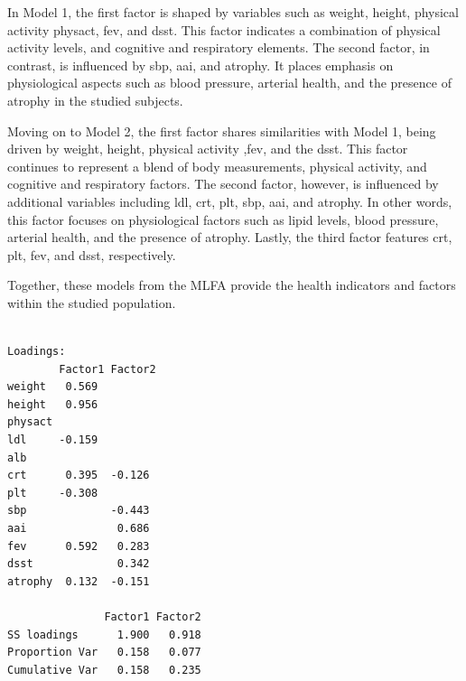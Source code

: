 \documentclass[
  letterpaper,
  DIV=11,
  numbers=noendperiod]{scrartcl}
\newenvironment{Shaded}{}{}
\newcommand{\AttributeTok}[1]{\textcolor[rgb]{0.84,0.60,0.13}{#1}}
\newcommand{\CommentTok}[1]{\textcolor[rgb]{0.57,0.51,0.45}{#1}}
\newcommand{\DecValTok}[1]{\textcolor[rgb]{0.96,0.45,0.00}{#1}}
\newcommand{\FunctionTok}[1]{\textcolor[rgb]{0.41,0.62,0.42}{#1}}
\newcommand{\NormalTok}[1]{\textcolor[rgb]{0.24,0.22,0.21}{#1}}
\newcommand{\OtherTok}[1]{\textcolor[rgb]{0.41,0.62,0.42}{#1}}
\newcommand{\SpecialCharTok}[1]{\textcolor[rgb]{0.69,0.38,0.53}{#1}}
\newcommand{\StringTok}[1]{\textcolor[rgb]{0.60,0.59,0.10}{#1}}
\begin{document}
In Model 1, the first factor is shaped by variables such as weight,
height, physical activity physact, fev, and dsst. This factor indicates
a combination of physical activity levels, and cognitive and respiratory
elements. The second factor, in contrast, is influenced by sbp, aai, and
atrophy. It places emphasis on physiological aspects such as blood
pressure, arterial health, and the presence of atrophy in the studied
subjects.

Moving on to Model 2, the first factor shares similarities with Model 1,
being driven by weight, height, physical activity ,fev, and the dsst.
This factor continues to represent a blend of body measurements,
physical activity, and cognitive and respiratory factors. The second
factor, however, is influenced by additional variables including ldl,
crt, plt, sbp, aai, and atrophy. In other words, this factor focuses on
physiological factors such as lipid levels, blood pressure, arterial
health, and the presence of atrophy. Lastly, the third factor features
crt, plt, fev, and dsst, respectively.

Together, these models from the MLFA provide the health indicators and
factors within the studied population.

\begin{Shaded}
\end{Shaded}

\begin{verbatim}

Loadings:
        Factor1 Factor2
weight   0.569         
height   0.956         
physact                
ldl     -0.159         
alb                    
crt      0.395  -0.126 
plt     -0.308         
sbp             -0.443 
aai              0.686 
fev      0.592   0.283 
dsst             0.342 
atrophy  0.132  -0.151 

               Factor1 Factor2
SS loadings      1.900   0.918
Proportion Var   0.158   0.077
Cumulative Var   0.158   0.235
\end{verbatim}
\end{document}
